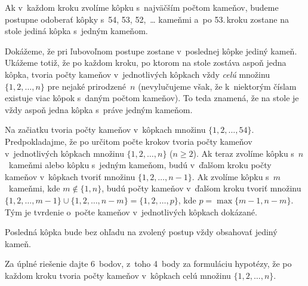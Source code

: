 {%
Ak v~každom kroku zvolíme kôpku s~najväčším počtom kameňov,
budeme postupne odoberať kôpky s~54, 53, 52,~\dots{} kameňmi
a~po 53.\,kroku zostane na stole jediná kôpka s~jedným kameňom.

Dokážeme, že pri ľubovoľnom postupe zostane v~poslednej kôpke
jediný kameň. Ukážeme totiž, že po každom kroku, po ktorom na stole
zostáva aspoň jedna kôpka, tvoria počty kameňov v~jednotlivých
kôpkach vždy {\it celú\/} množinu $\{1,2,\dots,n\}$ pre
nejaké prirodzené~$n$ (nevylučujeme však, že k~niektorým číslam
existuje viac kôpok s~daným počtom kameňov). To teda znamená, že
na stole je vždy aspoň jedna kôpka s~práve jedným kameňom.

Na začiatku tvoria počty kameňov v~kôpkach množinu
$\{1,2,\dots,54\}$. Predpokladajme, že po určitom počte krokov
tvoria počty kameňov v~jednotlivých kôpkach množinu
$\{1,2,\dots,n\}$ ($n\ge2$). Ak teraz zvolíme kôpku
s~$n$~kameňmi alebo kôpku s~jedným kameňom, budú v~ďalšom kroku
počty kameňov v~kôpkach tvoriť množinu $\{1,2,\dots,n-1\}$.
Ak zvolíme kôpku s~$m$~kameňmi, kde $m\notin\{1,n\}$, budú
počty kameňov v~ďalšom kroku tvoriť množinu
$\{1,2,\dots,m-1\}\cup\{1,2,\dots,n-m\}=\{1,2,\dots,p\}$, kde
$p=\max\{m-1, n-m\}$. Tým je tvrdenie o~počte kameňov
v~jednotlivých kôpkach dokázané.

\odpoved
Posledná kôpka bude bez ohľadu na zvolený
postup vždy obsahovať jediný kameň.

\nobreak\medskip\petit\noindent
Za úplné riešenie dajte 6~bodov, z~toho 4~body za formuláciu
hypotézy, že po každom kroku tvoria počty kameňov v~kôpkach
celú množinu $\{1,2,\dots,n\}$.
\endpetit
\bigbreak}

